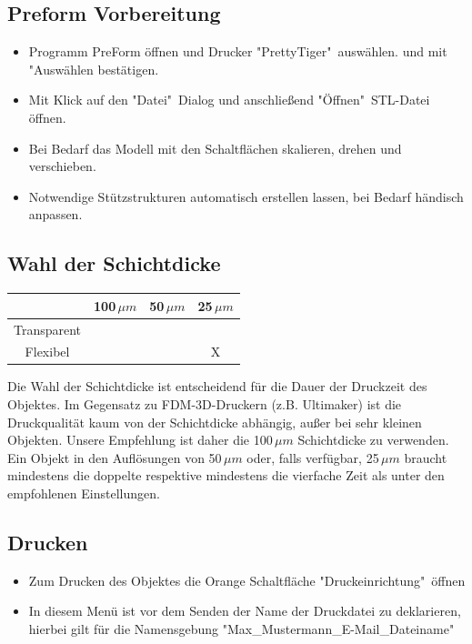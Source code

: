 \documentclass{\basedir/fablab-document}
\begin{document}
 \subsection{Preform Vorbereitung}
 
	\begin{itemize}
		\item Programm PreForm öffnen und Drucker "PrettyTiger"\, auswählen. und mit "Auswählen bestätigen.
		\item Mit Klick auf den "Datei"\ Dialog und anschließend "Öffnen"\ STL-Datei öffnen.
		\item Bei Bedarf das Modell mit den Schaltflächen skalieren, drehen und verschieben.
		\item Notwendige Stützstrukturen automatisch erstellen lassen, bei Bedarf händisch anpassen.
	\end{itemize}

\subsection{Wahl der Schichtdicke}

\begin{table} [H]
	\centering
	\begin{tabular}{|c|c|c|c|}\hline
	  & 100\,$\mu m$ & 50\,$\mu m$ & 25\,$\mu m $\\ \hline
	Transparent & \checkmark &\checkmark &\checkmark \\ \hline
	Flexibel & \checkmark &\checkmark & X\\ \hline
	\end{tabular}
\end{table}

Die Wahl der Schichtdicke ist entscheidend für die Dauer der Druckzeit des Objektes. Im Gegensatz zu FDM-3D-Druckern (z.B. Ultimaker) ist die Druckqualität kaum von der Schichtdicke abhängig, außer bei sehr kleinen Objekten. Unsere Empfehlung ist daher die 100\,$\mu m$ Schichtdicke zu verwenden. \\
Ein Objekt in den Auflösungen von 50\,$\mu m$ oder, falls verfügbar, 25\,$\mu m$ braucht mindestens die doppelte respektive mindestens die vierfache Zeit als unter den empfohlenen Einstellungen.
		 	
\subsection{Drucken}
 \begin{itemize}
 	
		\item Zum Drucken des Objektes die Orange Schaltfläche "Druckeinrichtung"\ öffnen\\
		\item In diesem Menü ist vor dem Senden der Name der Druckdatei zu deklarieren, hierbei gilt für die Namensgebung "Max\_Mustermann\_E-Mail\_Dateiname"\ 
\end{itemize}
	
\end{document}
